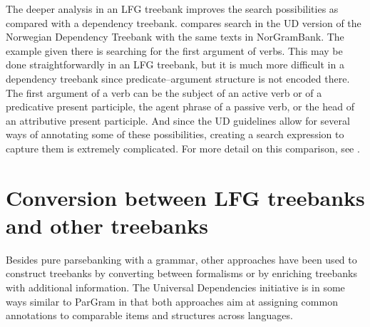 \documentclass[output=paper,hidelinks]{langscibook}
\begin{document}
The deeper analysis in an LFG treebank improves the search possibilities as compared with a dependency treebank.
\citet{Rosen20creating} compares search in the UD version of the Norwegian Dependency Treebank with the same texts in NorGramBank.
The example given there is searching for the first argument of verbs.
This may be done straightforwardly in an LFG treebank, but it is much more difficult in a dependency treebank since predicate--argument structure is not encoded there.
The first argument of a verb can be the subject of an active verb or of a predicative present participle, the agent phrase of a passive verb, or the head of an attributive present participle.
And since the UD guidelines allow for several ways of annotating some of these possibilities, creating a search expression to capture them is extremely complicated.
For more detail on this comparison, see \citet{Rosen20creating}.







\section{Conversion between LFG treebanks and other treebanks}\label{depbanks}



Besides pure parsebanking with a grammar, other approaches have been used to construct treebanks by converting between formalisms or by enriching treebanks with additional information.
The Universal Dependencies initiative is in some ways similar to ParGram in that both approaches aim at assigning common annotations to comparable items and structures across languages.
\end{document}
